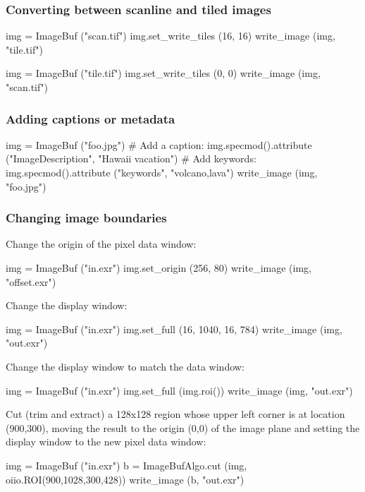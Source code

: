 \subsubsection*{Converting between scanline and tiled images}

\begin{code}
    img = ImageBuf ("scan.tif")
    img.set_write_tiles (16, 16)
    write_image (img, "tile.tif")

    img = ImageBuf ("tile.tif")
    img.set_write_tiles (0, 0)
    write_image (img, "scan.tif")
\end{code}


\subsubsection*{Adding captions or metadata}

\begin{code}
    img = ImageBuf ("foo.jpg")
    # Add a caption:
    img.specmod().attribute ("ImageDescription", "Hawaii vacation")
    # Add keywords:
    img.specmod().attribute ("keywords", "volcano,lava")
    write_image (img, "foo.jpg")
\end{code}


\subsubsection*{Changing image boundaries}

\noindent Change the origin of the pixel data window:
\begin{code}
    img = ImageBuf ("in.exr")
    img.set_origin (256, 80)
    write_image (img, "offset.exr")
\end{code}

\noindent Change the display window:
\begin{code}
    img = ImageBuf ("in.exr")
    img.set_full (16, 1040, 16, 784)
    write_image (img, "out.exr")
\end{code}

\noindent Change the display window to match the data window:
\begin{code}
    img = ImageBuf ("in.exr")
    img.set_full (img.roi())
    write_image (img, "out.exr")
\end{code}

\noindent Cut (trim and extract) a 128x128 region whose upper left corner
is at location (900,300), moving the result to the origin (0,0) of the image
plane and setting the display window to the new pixel data window:
\begin{code}
    img = ImageBuf ("in.exr")
    b = ImageBufAlgo.cut (img, oiio.ROI(900,1028,300,428))
    write_image (b, "out.exr")
\end{code}


